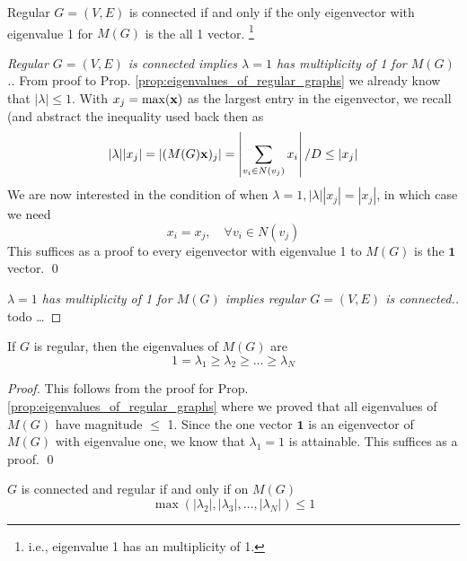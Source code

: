 \begin{proposition}
	Regular $G = (V, E)$ is connected if and only if the only eigenvector with eigenvalue 1 for $M(G)$ is the all 1 vector. \footnote{i.e., eigenvalue 1 has an multiplicity of 1.}
\end{proposition}

\begin{proof} [Regular $G = (V, E)$ is connected implies $\lambda = 1$ has multiplicity of 1 for $M(G)$.]
	From proof to Prop. \ref{prop:eigenvalues_of_regular_graphs} we already know that $|\lambda| \leq 1$. With $x_j = \max(\mathbf{x})$ as the largest entry in the eigenvector, we recall (and abstract the inequality used back then as
	\begin{equation}
		|\lambda||x_j| = |(M(G)\mathbf{x})_j| = \left| \sum_{v_i \in N(v_j)} x_i \right| / D \leq |x_j| 
	\end{equation}
	We are now interested in the condition of when $\lambda = 1, |\lambda| |x_j| = |x_j|$, in which case we need 
	\begin{equation}
		x_i = x_j, \quad \forall v_i \in N(v_j)
	\end{equation}
	This suffices as a proof to every eigenvector with eigenvalue 1 to $M(G)$ is the $\mathbf 1$ vector. \qed
\end{proof}

\begin{proof} [$\lambda = 1$ has multiplicity of 1 for $M(G)$ implies regular $G = (V, E)$ is connected.]
	todo \dots
\end{proof}

\begin{proposition}
	If $G$ is regular, then the eigenvalues of $M(G)$ are 
	\begin{equation}
		1 = \lambda_1 \geq \lambda_2 \geq \dots \geq \lambda_N
	\end{equation}
\end{proposition}

\begin{proof}
	This follows from the proof for Prop. \ref{prop:eigenvalues_of_regular_graphs} where we proved that all eigenvalues of $M(G)$ have magnitude $\leq$ 1. Since the one vector $\mathbf 1$ is an eigenvector of $M(G)$ with eigenvalue one, we know that $\lambda_1 = 1$ is attainable. This suffices as a proof. \qed
\end{proof}

\begin{proposition}
	$G$ is connected and regular if and only if on $M(G)$
	\begin{equation}
		\max ( |\lambda_2| , |\lambda_3|, \dots, |\lambda_N|) \leq 1
	\end{equation}
\end{proposition}

